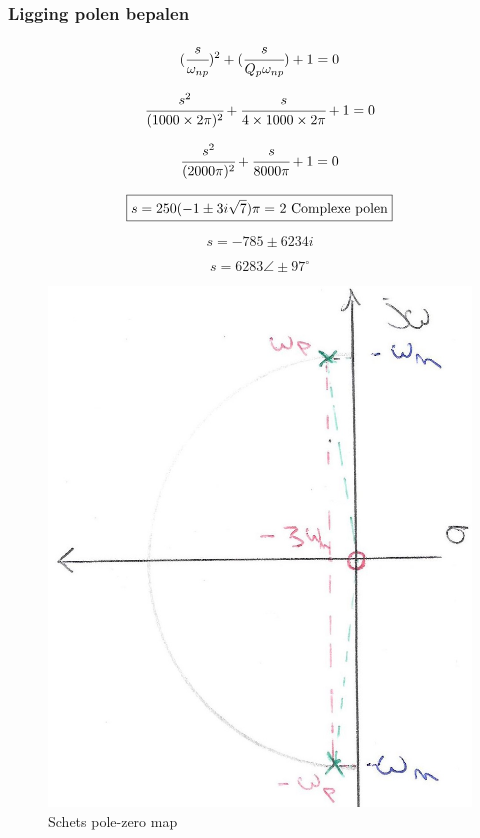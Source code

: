 \documentclass[]{article}
\begin{document}
\subsubsection*{Ligging polen bepalen}

\begin{equation*}
(\cfrac{s}{\omega_{np}})^{2}+(\cfrac{s}{Q_{p}\omega_{np}})+1 = 0
\end{equation*}

\begin{equation*}
\cfrac{s^{2}}{(1000\times2\pi)^{2}} + \cfrac{s}{4\times1000\times2\pi} + 1 = 0
\end{equation*}

\begin{equation*}
\cfrac{s^{2}}{(2000\pi)^{2}} + \cfrac{s}{8000\pi} + 1 = 0
\end{equation*}

\begin{equation*}
\boxed{ s = 250(-1 \pm 3i\sqrt{7})\pi = $ 2 Complexe polen$}
\end{equation*}

\begin{equation*}
\boxed{ s = −785 \pm 6234i}
\end{equation*}

\begin{equation*}
\boxed{ s =  6283\angle\pm97^\circ}
\end{equation*}




\begin{figure}[H]
	\centering
	\includegraphics[scale=1.2]{schets_pz}
	\caption{Schets pole-zero map}
\end{figure}
\end{document}
